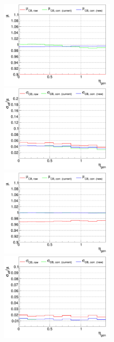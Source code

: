 \begin{figure}
  
\includegraphics[width=0.495\textwidth]{./plots_pdf/ECAL_plots/plotsNOPU/EB/FULL/pdf/GENETA/EBFULL_GENETA_0005_0020_MuOverBins.pdf}
\includegraphics[width=0.495\textwidth]{./plots_pdf/ECAL_plots/plotsNOPU/EB/FULL/pdf/GENETA/EBFULL_GENETA_0005_0020_EffSigmaOverBins.pdf}
\includegraphics[width=0.495\textwidth]{./plots_pdf/ECAL_plots/plotsNOPU/EB/FULL/pdf/GENETA/EBFULL_GENETA_0020_0100_MuOverBins.pdf}
\includegraphics[width=0.495\textwidth]{./plots_pdf/ECAL_plots/plotsNOPU/EB/FULL/pdf/GENETA/EBFULL_GENETA_0020_0100_EffSigmaOverBins.pdf}

\end{figure}
